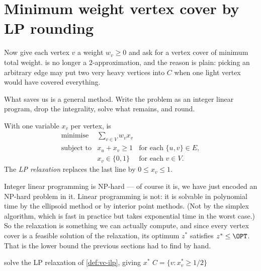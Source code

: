 \section{Minimum weight vertex cover by LP rounding}
\label{sec:lp-rounding}

Now give each vertex $v$ a weight $w_v \ge 0$ and ask for a vertex cover of
minimum total weight.  is no longer a $2$-approximation,
and the reason is plain: picking an arbitrary edge may put two very heavy
vertices into $C$ when one light vertex would have covered everything.

What saves us is a general method. Write the problem as an integer linear
program, drop the integrality, solve what remains, and round.

\begin{definition}\label{def:vc-ilp}
With one variable $x_v$ per vertex,  is
\[
\begin{array}{lll}
  \text{minimise}   & \displaystyle\sum_{v \in V} w_v x_v & \\[2pt]
  \text{subject to} & x_u + x_v \ge 1 & \text{for each } \{u,v\} \in E, \\[2pt]
                    & x_v \in \{0,1\} & \text{for each } v \in V.
\end{array}
\]
The \emph{LP relaxation} replaces the last line by $0 \le x_v \le 1$.
\end{definition}

Integer linear programming is \textrm{NP}-hard --- of course it is, we have
just encoded an \textrm{NP}-hard problem in it. Linear programming is not: it
is solvable in polynomial time by the ellipsoid method or by interior point
methods. (Not by the simplex algorithm, which is fast in practice but takes
exponential time in the worst case.) So the relaxation is something we can
actually compute, and since every vertex cover is a feasible solution of the
relaxation, its optimum $z^{*}$ satisfies $z^{*} \le \OPT$. That is the lower
bound the previous sections had to find by hand.

\begin{algorithm}[ht]
\caption{LP rounding for }
\label{alg:vc-lp-rounding}
\begin{algorithmic}[1]
  \State solve the LP relaxation of \cref{def:vc-ilp}, giving $x^{*}$
  \State \Return $C = \{v : x^{*}_v \ge 1/2\}$
\end{algorithmic}
\end{algorithm}

